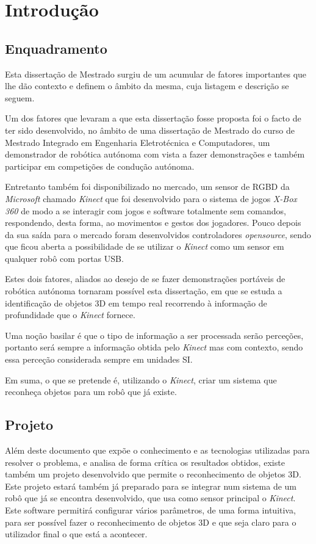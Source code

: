 \chapter{Introdução} \label{chap:intro}

\section{Enquadramento} \label{sec:context}

Esta dissertação de Mestrado surgiu de um acumular de fatores importantes que lhe dão contexto e definem o âmbito da mesma, cuja listagem e descrição se seguem.

Um dos fatores que levaram a que esta dissertação fosse proposta foi o facto de ter sido desenvolvido, no âmbito de uma dissertação de Mestrado do curso de Mestrado Integrado em Engenharia Eletrotécnica e Computadores, um demonstrador de robótica autónoma com vista a fazer demonstrações e também participar em competições de condução autónoma. 

Entretanto também foi disponibilizado no mercado, um sensor de RGBD da \emph{Microsoft} chamado \emph{Kinect} que foi desenvolvido para o sistema de jogos \emph{X-Box 360} de modo a se interagir com jogos e software totalmente sem comandos, respondendo, desta forma, ao movimentos e gestos dos jogadores. Pouco depois da sua saída para o mercado foram desenvolvidos controladores \emph{opensource}, sendo que ficou aberta a possibilidade de se utilizar o \emph{Kinect} como um sensor em qualquer robô com portas USB.

Estes dois fatores, aliados ao desejo de se fazer demonstrações portáveis de robótica autónoma tornaram possível esta dissertação, em que se estuda a identificação de objetos 3D em tempo real recorrendo à informação de profundidade que o \emph{Kinect} fornece.

Uma noção basilar é que o tipo de informação a ser processada serão perceções, portanto será sempre a informação obtida pelo \emph{Kinect} mas com contexto, sendo essa perceção considerada sempre em unidades SI.

Em suma, o que se pretende é, utilizando o \emph{Kinect}, criar um sistema que reconheça objetos para um robô que já existe.

\section{Projeto} \label{sec:proj}

Além deste documento que expõe o conhecimento e as tecnologias utilizadas para resolver o problema, e analisa de forma crítica os resultados obtidos, existe também um projeto desenvolvido que permite o reconhecimento de objetos 3D. Este projeto estará também já preparado para se integrar num sistema de um robô que já se encontra desenvolvido, que usa como sensor principal o \emph{Kinect}. Este software permitirá configurar vários parâmetros, de uma forma intuitiva, para ser possível fazer o reconhecimento de objetos 3D e que seja claro para o utilizador final o que está a acontecer.

